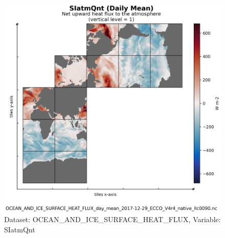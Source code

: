 \begin{figure}[H]
\centering
\includegraphics[scale=0.55]{../images/plots/native_plots/Ocean_and_Sea-Ice_Surface_Heat_Fluxes/SIatmQnt.png}
\caption{Dataset: OCEAN\_AND\_ICE\_SURFACE\_HEAT\_FLUX, Variable: SIatmQnt}
\label{tab:table-OCEAN_AND_ICE_SURFACE_HEAT_FLUX_SIatmQnt-Plot}
\end{figure}
\newpage
\pagebreak
